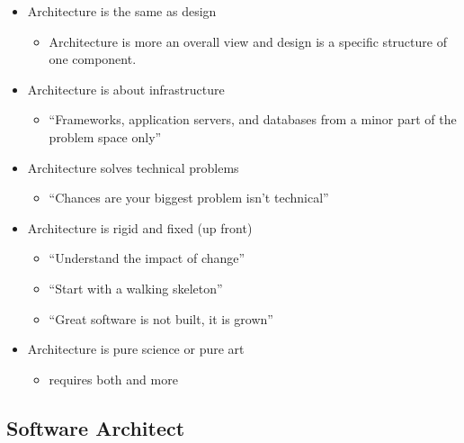 \begin{itemize}
\tightlist
\item
  Architecture is the same as design

  \begin{itemize}
  \tightlist
  \item
    Architecture is more an overall view and design is a specific
    structure of one component.
  \end{itemize}
\item
  Architecture is about infrastructure

  \begin{itemize}
  \tightlist
  \item
    ``Frameworks, application servers, and databases from a minor part
    of the problem space only''
  \end{itemize}
\item
  Architecture solves technical problems

  \begin{itemize}
  \tightlist
  \item
    ``Chances are your biggest problem isn't technical''
  \end{itemize}
\item
  Architecture is rigid and fixed (up front)

  \begin{itemize}
  \tightlist
  \item
    ``Understand the impact of change''
  \item
    ``Start with a walking skeleton''
  \item
    ``Great software is not built, it is grown''
  \end{itemize}
\item
  Architecture is pure science or pure art

  \begin{itemize}
  \tightlist
  \item
    requires both and more
  \end{itemize}
\end{itemize}

\hypertarget{software-architect}{%
\subsection{Software Architect}\label{software-architect}}

